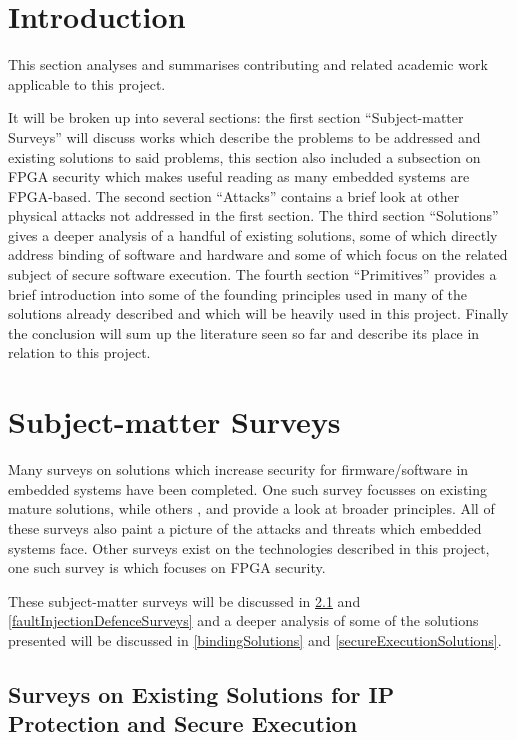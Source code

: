 \section{Introduction}\label{litIntroduction}

This section analyses and summarises contributing and related academic work applicable to this project.

It will be broken up into several sections: the first section ``Subject-matter Surveys'' will discuss works which describe the problems to be addressed and existing solutions to said problems, this section also included a subsection on FPGA security which makes useful reading as many embedded systems are FPGA-based. The second section ``Attacks'' contains a brief look at other physical attacks not addressed in the first section. The third section ``Solutions'' gives a deeper analysis of a handful of existing solutions, some of which directly address binding of software and hardware and some of which focus on the related subject of secure software execution. The fourth section ``Primitives'' provides a brief introduction into some of the founding principles used in many of the solutions already described and which will be heavily used in this project. Finally the conclusion will sum up the literature seen so far and describe its place in relation to this project.

\section{Subject-matter Surveys}\label{subjectMatterSurveys}

Many surveys on solutions which increase security for firmware/software in embedded systems have been completed. One such survey \cite{Shepherd2016} focusses on existing mature solutions, while others \cite{Bryant2004}, \cite{Collberg2002} and \cite{Theissing2013} provide a look at broader principles. All of these surveys also paint a picture of the attacks and threats which embedded systems face. Other surveys exist on the technologies described in this project, one such survey is \cite{Drimer2008} which focuses on FPGA security.

These subject-matter surveys will be discussed in \ref{solutionSurveys} and \ref{faultInjectionDefenceSurveys} and a deeper analysis of some of the solutions presented will be discussed in \ref{bindingSolutions} and \ref{secureExecutionSolutions}.


\subsection{Surveys on Existing Solutions for IP Protection and Secure Execution}\label{solutionSurveys}

